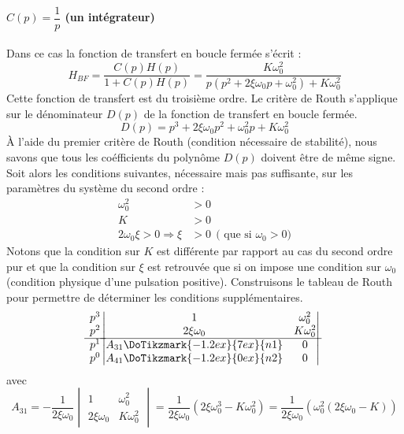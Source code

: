 \paragraph{$C(p)=\dfrac{1}{p}$ (un intégrateur)}
Dans ce cas la fonction de transfert en boucle fermée s'écrit :
\[
H_{BF}=\dfrac{C(p)H(p)}{1+C(p)H(p)}=
       \dfrac{K\omega_0^2}{p(p^2+2\xi\omega_0p+\omega_0^2)+K\omega_0^2}
\]
Cette fonction de transfert est du troisième ordre.
Le critère de Routh s'applique sur le dénominateur $D(p)$ de la fonction 
de transfert en boucle fermée.
\[
D(p)=p^3+2\xi\omega_0p^2+\omega_0^2p+K\omega_0^2
\]
\`A l'aide du premier critère de Routh (condition nécessaire de stabilité), nous
savons que tous les coéfficients du polynôme $D(p)$ doivent être de même signe.
Soit alors les conditions suivantes, nécessaire mais pas suffisante, sur les 
paramètres du système du second ordre :
\begin{align*}
    \omega_0^2&>0 \\
    K&>0 \\
     2\omega_0\xi > 0 \Rightarrow\xi&> 0\:\:\text{( que si $\omega_0>0$)}
\end{align*}
Notons que la condition sur $K$ est différente par rapport au cas du second 
ordre pur et que la condition sur $\xi$ est retrouvée que si on impose 
une condition sur $\omega_0$ (condition physique d'une pulsation positive). 
Construisons le tableau de Routh pour permettre de déterminer les conditions 
supplémentaires.
\[
\begin{matrix}
    p^3 \\
    p^2 \\
    \hline
    p^1 \\
    p^0 \\
\end{matrix}
\begin{vmatrix}
    1     & \omega_0^2  \\
    2\xi\omega_0    & K\omega_0^2  \\
    \hline
    A_{31}\DoTikzmark{-1.2ex}{7ex}{n1}  & 0  \\
    A_{41}\DoTikzmark{-1.2ex}{0ex}{n2}  & 0    
    \end{vmatrix}
\]
avec
\[
A_{31}=-\dfrac{1}{2\xi\omega_0}
        \begin{vmatrix}
        1&\omega_0^2\\
        2\xi\omega_0&K\omega_0^2
        \end{vmatrix}
      = \dfrac{1}{2\xi\omega_0}(2\xi\omega_0^3-K\omega_0^2) = 
      \dfrac{1}{2\xi\omega_0}\left(\omega_0^2(2\xi\omega_0-K)\right)
\]
